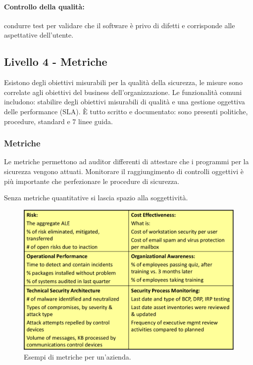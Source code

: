 \paragraph*{Controllo della qualità:} condurre test per validare che il 
software è privo di difetti e corrisponde alle aspettative dell'utente.

\subsection{Livello 4 - Metriche}

Esistono degli obiettivi misurabili per la qualità della sicurezza, le misure 
sono correlate agli obiettivi del business dell'organizzazione. Le 
funzionalità comuni includono: stabilire degli obiettivi misurabili di qualità 
e una gestione oggettiva delle performance (SLA).
È tutto scritto e documentato: sono presenti politiche, procedure, standard e 7
linee guida.

\subsubsection{Metriche}

Le metriche permettono ad auditor differenti di attestare che i programmi per 
la sicurezza vengono attuati. Monitorare il raggiungimento di controlli 
oggettivi è più importante che perfezionare le procedure di sicurezza.

Senza metriche quantitative si lascia spazio alla soggettività.

\begin{figure}[h!]
        \begin{center}
                \includegraphics[scale=1.5]{res/img/metriche}
        \end{center}
        \caption{Esempi di metriche per un'azienda.}
\end{figure}

